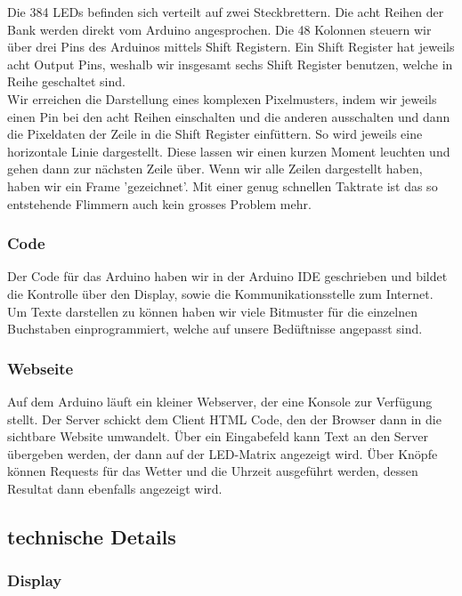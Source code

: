 \documentclass[10pt,a4paper]{article}
\begin{document}
Die 384 LEDs befinden sich verteilt auf zwei Steckbrettern. Die acht Reihen der Bank werden direkt vom Arduino angesprochen. Die 48 Kolonnen steuern wir über drei Pins des Arduinos mittels Shift Registern. Ein Shift Register hat jeweils acht Output Pins, weshalb wir insgesamt sechs Shift Register benutzen, welche in Reihe geschaltet sind.\\
Wir erreichen die Darstellung eines komplexen Pixelmusters, indem wir jeweils einen Pin bei den acht Reihen einschalten und die anderen ausschalten und dann die Pixeldaten der Zeile in die Shift Register einfüttern. So wird jeweils eine horizontale Linie dargestellt. Diese lassen wir einen kurzen Moment leuchten und gehen dann zur nächsten Zeile über. Wenn wir alle Zeilen dargestellt haben, haben wir ein Frame 'gezeichnet'. Mit einer genug schnellen Taktrate ist das so entstehende Flimmern auch kein grosses Problem mehr.\\

\subsubsection{Code}

Der Code für das Arduino haben wir in der Arduino IDE geschrieben und bildet die Kontrolle über den Display, sowie die Kommunikationsstelle zum Internet.\\
Um Texte darstellen zu können haben wir viele Bitmuster für die einzelnen Buchstaben einprogrammiert, welche auf unsere Bedüftnisse angepasst sind.\\

\subsubsection{Webseite}

Auf dem Arduino läuft ein kleiner Webserver, der eine Konsole zur Verfügung stellt. Der Server schickt dem Client HTML Code, den der Browser dann in die sichtbare Website umwandelt. Über ein Eingabefeld kann Text an den Server übergeben werden, der dann auf der LED-Matrix angezeigt wird. Über Knöpfe können Requests für das Wetter und die Uhrzeit ausgeführt werden, dessen Resultat dann ebenfalls angezeigt wird.

\subsection{technische Details}

\subsubsection{Display}
\end{document}
